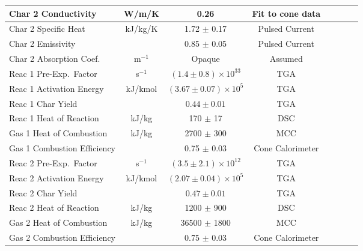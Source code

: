 \begin{table}[h!]
\begin{center}
\begin{tabular}{|l|c|c|c|c|c|l|l|}
Char 2 Conductivity         & W/m/K         & 0.26                              & Fit to cone data          &  \cite{Stoliarov:CF2010}      \\ \hline
Char 2 Specific Heat        & kJ/kg/K       & 1.72 $\pm$ 0.17                   & Pulsed Current   &  \cite{Stoliarov:CF2010,Matsumoto:1996}  \\ \hline
Char 2 Emissivity           &               & 0.85 $\pm$ 0.05                   & Pulsed Current    &  \cite{Stoliarov:CF2010,Matsumoto:1996}  \\ \hline
Char 2 Absorption Coef.     & m$^{-1}$      & Opaque                            & Assumed                   &  \cite{Stoliarov:CF2010}      \\ \hline
Reac 1 Pre-Exp.~Factor      & s$^{-1}$      & $(1.4 \pm 0.8) \times 10^{33}$    & TGA                       &  \cite{Stoliarov:CF2010}      \\ \hline
Reac 1 Activation Energy    & kJ/kmol       & $(3.67 \pm 0.07) \times 10^{5}$   & TGA                       &  \cite{Stoliarov:CF2010}      \\ \hline
Reac 1 Char Yield           &               & $0.44 \pm 0.01$                   & TGA                       &  \cite{Stoliarov:CF2010}      \\ \hline
Reac 1 Heat of Reaction     & kJ/kg         & 170 $\pm$ 17                      & DSC                       &  \cite{Stoliarov:PDS2008}     \\ \hline
Gas 1 Heat of Combustion    & kJ/kg         & 2700 $\pm$ 300                    & MCC                       &  \cite{Stoliarov:CF2010}      \\ \hline
Gas 1 Combustion Efficiency &               & 0.75 $\pm$ 0.03                   & Cone Calorimeter          &  \cite{Stoliarov:CF2010}      \\ \hline
Reac 2 Pre-Exp.~Factor      & s$^{-1}$      & $(3.5 \pm 2.1) \times 10^{12}$    & TGA                       &  \cite{Stoliarov:CF2010}      \\ \hline
Reac 2 Activation Energy    & kJ/kmol       & $(2.07 \pm 0.04) \times 10^{5}$   & TGA                       &  \cite{Stoliarov:CF2010}      \\ \hline
Reac 2 Char Yield           &               & $0.47 \pm 0.01$                   & TGA                       &  \cite{Stoliarov:CF2010}      \\ \hline
Reac 2 Heat of Reaction     & kJ/kg         & 1200 $\pm$ 900                    & DSC                       &  \cite{Stoliarov:PDS2008}     \\ \hline
Gas 2 Heat of Combustion    & kJ/kg         & 36500 $\pm$ 1800                  & MCC                       &  \cite{Stoliarov:CF2010}      \\ \hline
Gas 2 Combustion Efficiency &               & 0.75 $\pm$ 0.03                   & Cone Calorimeter          &  \cite{Stoliarov:CF2010}      \\ \hline
\end{tabular}
\end{center}
\label{Properties_PVC}
\end{table}

